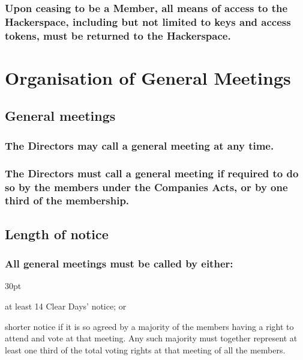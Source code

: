 \documentclass[12pt]{article}
\def\clauseindent{30pt}
\newenvironment{subindentpara}{\raggedright\begin{adjustwidth}{\clauseindent}{}\begin{hanginglist}}{\end{hanginglist}\end{adjustwidth}}
\begin{document}
\subsubsection[Return of keys upon membership termination]{Upon ceasing to be a Member, all means of access to the Hackerspace, including but not limited to keys and access tokens, must be returned to the Hackerspace.}

\vspace{1.5\baselineskip}\section*{Organisation of General Meetings}

\subsection{General meetings}
\subsubsection[Directors may call a general meeting]{The Directors may call a general meeting at any time.}
\subsubsection[Directors may be compelled to call general meeting]{The Directors must call a general meeting if required to do so by the members under the Companies Acts, or by one third of the membership.}

\subsection[Length of notice of general meetings]{Length of notice}
\subsubsection[Specifics of length of notice of general meetings]{All general meetings must be called by either:}
\begin{subindentpara}
    \item at least 14 Clear Days' notice; or
    \item shorter notice if it is so agreed by a majority of the members having a right to attend and vote at that meeting. Any such majority must together represent at least one third of the total voting rights at that meeting of all the members.
\end{subindentpara}
\end{document}
